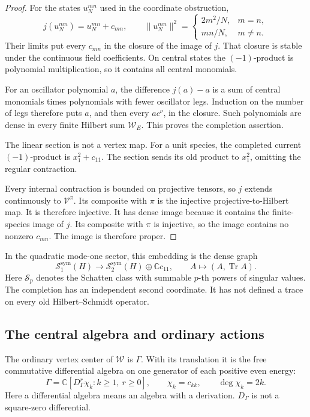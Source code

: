 \begin{proof}
For the states \(u_N^{mn}\) used in the
coordinate obstruction,
\[
 j(u_N^{mn})=u_N^{mn}+c_{mn},\qquad
 \|u_N^{mn}\|^2=
 \begin{cases}
   2m^2/N,&m=n,\\
   mn/N,&m\ne n.
 \end{cases}
\]
Their limits put every \(c_{mn}\) in the
closure of the image of \(j\). That closure
is stable under the continuous field
coefficients. On central states the
\((-1)\)-product is polynomial multiplication,
so it contains all central monomials.

For an oscillator polynomial \(a\), the
difference \(j(a)-a\) is a sum of central
monomials times polynomials with fewer
oscillator legs. Induction on the number
of legs therefore puts \(a\), and then
every \(ac^\nu\), in the closure. Such
polynomials are dense in every finite
Hilbert sum \(\mathcal W_E\). This proves
the completion assertion.

The linear section is not a vertex map.
For a unit species, the completed
current \((-1)\)-product is \(x_1^2+c_{11}\).
The section sends its old product to \(x_1^2\),
omitting the regular contraction.

Every internal contraction is bounded on
projective tensors, so \(j\) extends
continuously to \(\mathcal V^\pi\).
Its composite with \(\pi\) is the
injective projective-to-Hilbert map.
It is therefore injective. It has dense
image because it contains the finite-species
image of \(j\). Its composite with \(\pi\)
is injective, so the image contains no
nonzero \(c_{mn}\). The image is therefore proper.
\end{proof}

In the quadratic mode-one sector, this
embedding is the dense graph
\[
 \mathcal S_1^{\mathrm{sym}}(H)
   \longrightarrow\mathcal S_2^{\mathrm{sym}}(H)\oplus\mathbb Cc_{11},
 \qquad A\longmapsto(A,\operatorname{Tr}A).
\]
Here \(\mathcal S_p\) denotes the Schatten
class with summable \(p\)-th powers of
singular values. The completion has an
independent second coordinate. It has
not defined a trace on every old
Hilbert--Schmidt operator.

\subsection{The central algebra and ordinary actions}

\begin{theorem}\label{v4-thm:singular-contraction-centre}
The ordinary vertex center of \(\mathcal W\)
is \(\Gamma\). With its translation it is
the free commutative differential algebra
on one generator of each positive even energy:
\begin{equation}\label{v4-eq:singular-contraction-centre}
 \Gamma=\mathbb C[D_\Gamma^r\chi_k:k\geq1,\ r\geq0],
 \qquad \chi_k=c_{kk},\qquad \deg\chi_k=2k.
\end{equation}
Here a differential algebra means an
algebra with a derivation. \(D_\Gamma\)
is not a square-zero differential.
\end{theorem}

